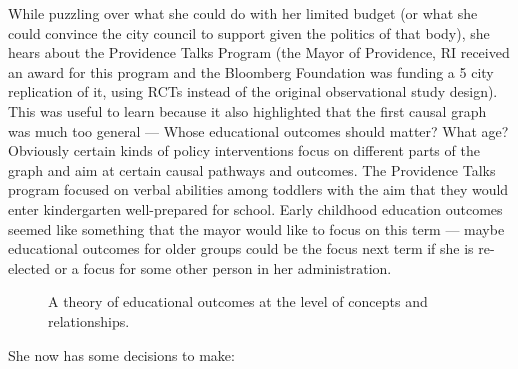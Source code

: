 \documentclass[
]{article}
\begin{document}
While puzzling over what she could do with her limited budget (or what
she could convince the city council to support given the politics of
that body), she hears about the Providence Talks Program (the Mayor of
Providence, RI received an award for this program and the Bloomberg
Foundation was funding a 5 city replication of it, using RCTs instead of
the original observational study design). This was useful to learn
because it also highlighted that the first causal graph was much too
general --- Whose educational outcomes should matter? What age?
Obviously certain kinds of policy interventions focus on different parts
of the graph and aim at certain causal pathways and outcomes. The
Providence Talks program focused on verbal abilities among toddlers with
the aim that they would enter kindergarten well-prepared for school.
Early childhood education outcomes seemed like something that the mayor
would like to focus on this term --- maybe educational outcomes for
older groups could be the focus next term if she is re-elected or a
focus for some other person in her administration.

\begin{figure}[!h]
\centering
{}
\caption{A theory of educational outcomes at the level of concepts and
relationships.}\label{fig:theory2}
\end{figure}

She now has some decisions to make:
\end{document}
